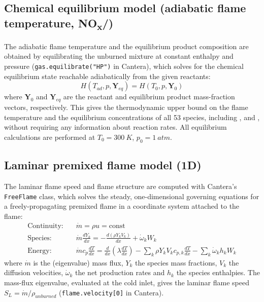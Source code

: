 \documentclass[11pt,a4paper]{article}
\begin{document}
\subsection{Chemical equilibrium model (adiabatic flame temperature, NO\textsubscript{x}/)}

The adiabatic flame temperature and the equilibrium product composition are obtained by equilibrating the unburned
mixture at constant enthalpy and pressure (\texttt{gas.equilibrate("HP")} in Cantera), which solves for the chemical
equilibrium state reachable adiabatically from the given reactants:
\begin{equation}
    H(T_{ad}, p, \mathbf{Y}_{eq}) = H(T_0, p, \mathbf{Y}_0)
\end{equation}
where $\mathbf{Y}_0$ and $\mathbf{Y}_{eq}$ are the reactant and equilibrium product mass-fraction vectors,
respectively. This gives the thermodynamic upper bound on the flame temperature and the equilibrium concentrations
of all 53 species, including ,  and , without requiring any information about reaction rates.
All equilibrium calculations are performed at $T_0=\SI{300}{K}$, $p_0=\SI{1}{atm}$.

\subsection{Laminar premixed flame model (1D)}

The laminar flame speed and flame structure are computed with Cantera's \texttt{FreeFlame} class, which solves the
steady, one-dimensional governing equations for a freely-propagating premixed flame in a coordinate system attached
to the flame:
\begin{align}
    \text{Continuity:} \quad & \dot{m} = \rho u = \text{const} \\
    \text{Species:} \quad & \dot{m}\frac{dY_k}{dx} = -\frac{d(\rho Y_k V_k)}{dx} + \dot{\omega}_k W_k \\
    \text{Energy:} \quad & \dot{m} c_p \frac{dT}{dx} = \frac{d}{dx}\left(\lambda \frac{dT}{dx}\right)
    - \sum_k \rho Y_k V_k c_{p,k}\frac{dT}{dx} - \sum_k \dot{\omega}_k h_k W_k
\end{align}
where $\dot{m}$ is the (eigenvalue) mass flux, $Y_k$ the species mass fractions, $V_k$ the diffusion velocities,
$\dot{\omega}_k$ the net production rates and $h_k$ the species enthalpies. The mass-flux eigenvalue, evaluated at
the cold inlet, gives the laminar flame speed $S_L = \dot{m}/\rho_{unburned}$ (\texttt{flame.velocity[0]} in
Cantera).
\end{document}
